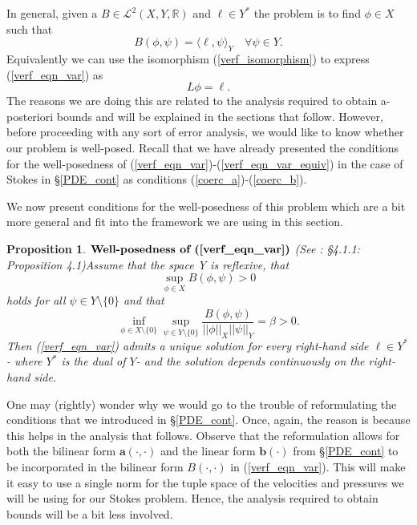 \documentclass[12pt,a4paper]{article}
\newtheorem{proposition}[theorem]{Proposition}
\theoremstyle{definition}
\begin{document}
In general, given a $B\in \mathcal{L}^2\left(X,Y,\mathbb{R}\right)$ and $\ell \in Y^*$ the problem is to find $\phi \in X$ such that 
\begin{equation}\label{verf_eqn_var}
B\left(\phi,\psi\right)=\langle\ell,\psi\rangle_Y\quad \forall \psi \in Y.
\end{equation}
Equivalently we can use the isomorphism (\ref{verf_isomorphism}) to express (\ref{verf_eqn_var}) as
\begin{equation}\label{verf_eqn_var_equiv}
L\phi=\ell.
\end{equation}
The reasons we are doing this are related to the analysis required to obtain a-posteriori bounds and will be explained in the sections that follow.  However, before proceeding with any sort of error analysis, we would like to know whether our problem is well-posed.   Recall that we have already presented the conditions for the well-posedness of (\ref{verf_eqn_var})-(\ref{verf_eqn_var_equiv}) in the case of Stokes in \S \ref{PDE_cont} as conditions (\ref{coerc_a})-(\ref{coerc_b}).

We now present conditions for the well-posedness of this problem which are a bit more general and fit into the framework we are using in this section.  
\begin{proposition}{$\textbf{Well-posedness of (\ref{verf_eqn_var})}$} (See \cite{verfurth2013posteriori}: \S 4.1.1: Proposition 4.1)\label{prop_well_pos_verf}
Assume that the space Y is reflexive, that
\begin{equation}
	\sup_{\phi \in X}B\left(\phi,\psi\right)>0
\end{equation}
holds for all $\psi\in Y\setminus \lbrace 0 \rbrace$ and that
\begin{equation}
	\inf_{\phi\in X\setminus \lbrace0\rbrace}\sup_{\psi \in Y\setminus \lbrace0\rbrace}\frac{B\left(\phi,\psi\right)}{\left|\left|\phi\right|\right|_X\left|\left|\psi\right|\right|_Y}=\beta > 0.
\end{equation}
Then (\ref{verf_eqn_var}) admits a unique solution for every right-hand side $\ell\in Y^*$ - where $Y^*$ is the dual of $Y$- and the solution depends continuously on the right-hand side.
\end{proposition}
One may (rightly) wonder why we would go to the trouble of reformulating the conditions that we introduced in \S \ref{PDE_cont}.  Once, again, the reason is because this helps in the analysis that follows.  Observe that the reformulation allows for both the bilinear form $\textbf{a}\left(\cdot,\cdot\right)$ and the linear form $\textbf{b}\left(\cdot\right)$ from \S \ref{PDE_cont} to be incorporated in the bilinear form $B\left(\cdot,\cdot\right)$ in (\ref{verf_eqn_var}).  This will make it easy to use a single norm for the tuple space of the velocities and pressures we will be using for our Stokes problem.  Hence, the analysis required to obtain bounds will be a bit less involved. 
\end{document}
